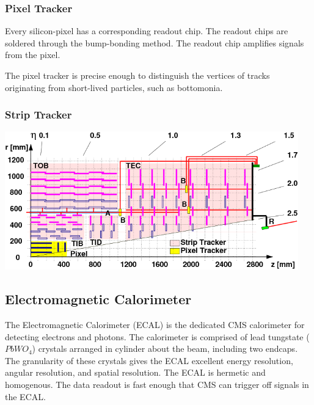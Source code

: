\subsubsection{Pixel Tracker}

Every silicon-pixel has a corresponding readout chip. The readout chips are soldered through the bump-bonding method. The readout chip amplifies signals from the pixel.

The pixel tracker is precise enough to distinguish the vertices of tracks originating from short-lived particles, such as bottomonia. 

\subsubsection{Strip Tracker}

\centerline{
\includegraphics[width=5in]{Chapter3/importfigs/cms_cft_09_003_fig1.png}
}

\subsection{Electromagnetic Calorimeter}

The Electromagnetic Calorimeter (ECAL) is the dedicated CMS calorimeter for detecting electrons and photons. The calorimeter is comprised of lead tungstate ($PbWO_4$) crystals arranged in cylinder about the beam, including two endcaps. The granularity of these crystals gives the ECAL excellent energy resolution, angular resolution, and spatial resolution. The ECAL is hermetic and homogenous. The data readout is fast enough that CMS can trigger off signals in the ECAL.

